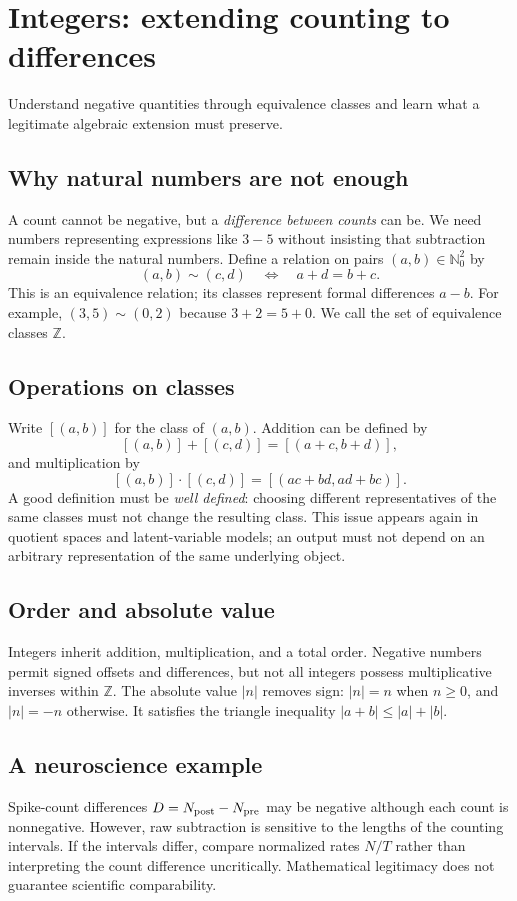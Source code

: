 \chapter{Integers: extending counting to differences}\label{ch:integers}
\begin{readergoal}Understand negative quantities through equivalence classes and learn what a legitimate algebraic extension must preserve.\end{readergoal}
\section{Why natural numbers are not enough}
A count cannot be negative, but a \emph{difference between counts} can be. We need numbers representing expressions like $3-5$ without insisting that subtraction remain inside the natural numbers. Define a relation on pairs $(a,b)\in\mathbb N_0^2$ by
\[(a,b)\sim(c,d)\quad\Longleftrightarrow\quad a+d=b+c.\]
This is an equivalence relation; its classes represent formal differences $a-b$. For example, $(3,5)\sim(0,2)$ because $3+2=5+0$. We call the set of equivalence classes $\mathbb Z$.

\section{Operations on classes}
Write $[(a,b)]$ for the class of $(a,b)$. Addition can be defined by
\[[(a,b)]+[(c,d)]=[(a+c,b+d)],\]
and multiplication by
\[[(a,b)]\cdot[(c,d)]=[(ac+bd,ad+bc)].\]
A good definition must be \emph{well defined}: choosing different representatives of the same classes must not change the resulting class. This issue appears again in quotient spaces and latent-variable models; an output must not depend on an arbitrary representation of the same underlying object.

\section{Order and absolute value}
Integers inherit addition, multiplication, and a total order. Negative numbers permit signed offsets and differences, but not all integers possess multiplicative inverses within $\mathbb Z$. The absolute value $|n|$ removes sign: $|n|=n$ when $n\ge0$, and $|n|=-n$ otherwise. It satisfies the triangle inequality $|a+b|\le|a|+|b|$.

\section{A neuroscience example}
Spike-count differences $D=N_{\rm post}-N_{\rm pre}$ may be negative although each count is nonnegative. However, raw subtraction is sensitive to the lengths of the counting intervals. If the intervals differ, compare normalized rates $N/T$ rather than interpreting the count difference uncritically. Mathematical legitimacy does not guarantee scientific comparability.

